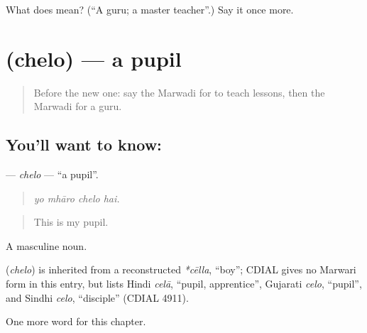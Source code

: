 \begin{tcolorbox}[breakable,colback=teal!4,colframe=teal!35!black,title={Before you move on}]
What does  mean? (\textquotedblleft{}A guru; a master teacher\textquotedblright{}.) Say it once more.
\end{tcolorbox}
\section[\texorpdfstring{\mw{चेलो} (chelo)}{चेलो (chelo)}]{ (chelo) — a pupil}

\label{lesson:MW-C287-chelo}



\begin{quote}
Before the new one: say the Marwadi for to teach lessons, then the Marwadi for a guru.
\end{quote}

\subsection*{You'll want to know: }
\textbf{} — \emph{chelo} — \textquotedblleft{}a pupil\textquotedblright{}.

\begin{quote}
   
\end{quote}

\begin{quote}
\emph{yo mhāro chelo hai.}
\end{quote}

\begin{quote}
This is my pupil.
\end{quote}

A masculine noun.

\begin{cousinweb}
\textbf{} (\emph{chelo}) is inherited from a reconstructed \emph{*cēlla}, \textquotedblleft{}boy\textquotedblright{}; CDIAL gives no Marwari form in this entry, but lists Hindi \emph{celā}, \textquotedblleft{}pupil, apprentice\textquotedblright{}, Gujarati \emph{celo}, \textquotedblleft{}pupil\textquotedblright{}, and Sindhi \emph{celo}, \textquotedblleft{}disciple\textquotedblright{} (CDIAL 4911).
\end{cousinweb}

\begin{grammarlens}[title={What you've built}]
One more word for this chapter.
\end{grammarlens}

